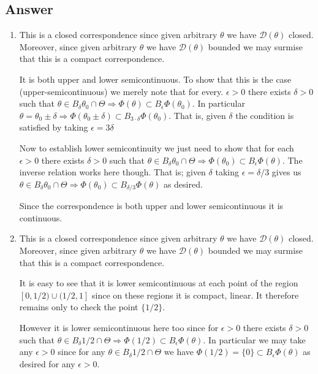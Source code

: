 \documentclass[12pt]{article}
\begin{document}
\subsection{Answer}
\begin{enumerate}
\item This is a closed correspondence since given arbitrary $\theta$ we have $\mathcal{D}(\theta) $ closed. Moreover, since given arbitrary $\theta$ we have $\mathcal{D}(\theta) $ bounded we may surmise that this is a compact correspondence. 

It is both upper and lower semicontinuous. To show that this is the case (upper-semicontinuous) we merely note that for every. $\epsilon > 0$ there exists $\delta > 0$ such that $\theta \in B_\delta \theta_0 \cap \Theta \Rightarrow \Phi(\theta) \subset B_\epsilon \Phi(\theta_0)$. In particular $\theta = \theta_0 \pm \delta \Rightarrow \Phi(\theta_0 \pm \delta) \subset B_{3 \cdot \delta} \Phi(\theta_0)$. That is, given $\delta$ the condition is satisfied by taking $\epsilon = 3 \delta$

Now to establish lower semicontinuity we just need to show that for each $\epsilon >0$ there exists $\delta >0$ such that $\theta \in B_\delta \theta_0 \cap \Theta \Rightarrow \Phi(\theta_0) \subset B_\epsilon \Phi(\theta)$. The inverse relation works here though. That is; given $\delta$ taking $\epsilon = \delta / 3$ gives us  $\theta \in B_\delta \theta_0 \cap \Theta \Rightarrow \Phi(\theta_0) \subset B_{\delta/3} \Phi(\theta)$ as desired.

Since the correspondence is both upper and lower semicontinuous it is continuous.

\item This is a closed correspondence since given arbitrary $\theta$ we have $\mathcal{D}(\theta) $ closed. Moreover, since given arbitrary $\theta$ we have $\mathcal{D}(\theta) $ bounded we may surmise that this is a compact correspondence. 

It is easy to see that it is lower semicontinuous at each point of the region $[0,1/2) \cup (1/2,1]$ since on these regions it is compact, linear. It therefore remains only to check the point $\{1/2\}$.

However it is lower semicontinuous here too since for $\epsilon >0$ there exists $\delta >0$ such that $\theta \in B_\delta 1/2 \cap \Theta \Rightarrow \Phi(1/2) \subset B_\epsilon \Phi(\theta)$. In particular we may take any $\epsilon>0$ since for any $\theta \in B_\delta 1/2 \cap \Theta$ we have $\Phi(1/2) = \{0\} \subset B_\epsilon \Phi(\theta)$ as desired for any $\epsilon >0$.


\end{enumerate}
\end{document}
